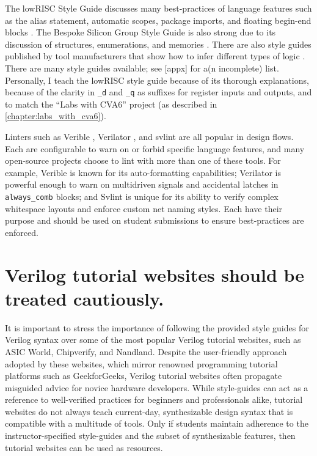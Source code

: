 The lowRISC Style Guide discusses many best-practices of language features such as the alias statement, automatic scopes, package imports, and floating begin-end blocks \cite{lowRISCstyleguides}. The Bespoke Silicon Group Style Guide is also strong due to its discussion of structures, enumerations, and memories \cite{BSGstyleguide}. There are also style guides published by tool manufacturers that show how to infer different types of logic \cite{Xilinxstyleguide, Intelstyleguide, Latticestyleguide}. There are many style guides available; see [appx] for a(n incomplete) list. Personally, I teach the lowRISC style guide because of its thorough explanations, because of the clarity in \texttt{_d} and \texttt{_q} as suffixes for register inputs and outputs, and to match the ``Labs with CVA6'' project (as described in \autoref{chapter:labs_with_cva6}).

Linters such as Verible \cite{veribleGitHub}, Verilator \cite{verilatorGitHub}, and svlint \cite{svlintGitHub} are all popular in design flows. Each are configurable to warn on or forbid specific language features, and many open-source projects choose to lint with more than one of these tools. For example, Verible is known for its auto-formatting capabilities; Verilator is powerful enough to warn on multidriven signals and accidental latches in \texttt{always_comb} blocks; and Svlint is unique for its ability to verify complex whitespace layouts and enforce custom net naming styles. Each have their purpose and should be used on student submissions to ensure best-practices are enforced.

\section{Verilog tutorial websites should be treated cautiously.}

It is important to stress the importance of following the provided style guides for Verilog syntax over some of the most popular Verilog tutorial websites, such as ASIC World, Chipverify, and Nandland. Despite the user-friendly approach adopted by these websites, which mirror renowned programming tutorial platforms such as GeekforGeeks, Verilog tutorial websites often propagate misguided advice for novice hardware developers. While style-guides can act as a reference to well-verified practices for beginners and professionals alike, tutorial websites do not always teach current-day, synthesizable design syntax that is compatible with a multitude of tools. Only if students maintain adherence to the instructor-specified style-guides and the subset of synthesizable features, then tutorial websites can be used as resources.


